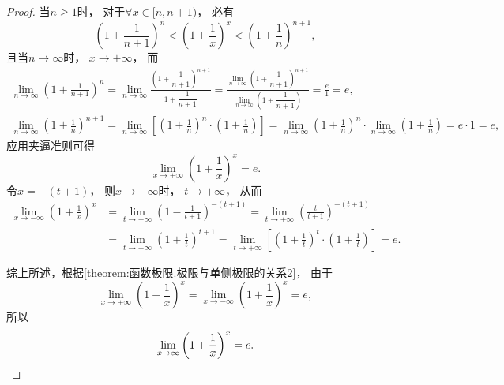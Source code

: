 \begin{example}[重要极限II]
\begin{proof}
当\(n\geq1\)时，
对于\(\forall x\in[n,n+1)\)，
必有\begin{equation*}
	\left(1+\frac1{n+1}\right)^n
	< \left(1+\frac1x\right)^x
	< \left(1+\frac1n\right)^{n+1},
\end{equation*}
且当\(n\to\infty\)时，
\(x\to+\infty\)，
而\begin{gather*}
	\lim_{n\to\infty} \left(1+\frac1{n+1}\right)^n
	= \lim_{n\to\infty} \frac{\left(1+\dfrac1{n+1}\right)^{n+1}}{1+\dfrac1{n+1}}
	= \frac{\lim\limits_{n\to\infty} \left(1+\dfrac1{n+1}\right)^{n+1}}{\lim\limits_{n\to\infty} \left(1+\dfrac1{n+1}\right)}
	= \frac{e}1
	= e, \\
	\lim_{n\to\infty} \left(1+\frac1n\right)^{n+1}
	= \lim_{n\to\infty} \left[\left(1+\frac1n\right)^n\cdot\left(1+\frac1n\right)\right]
	= \lim_{n\to\infty} \left(1+\frac1n\right)^n \cdot \lim_{n\to\infty} \left(1+\frac1n\right)
	= e \cdot 1
	= e,
\end{gather*}
应用\hyperref[theorem:函数极限.夹逼准则]{夹逼准则}可得\begin{equation*}
	\lim_{x\to+\infty} \left(1+\frac1x\right)^x = e.
\end{equation*}
令\(x=-(t+1)\)，
则\(x\to-\infty\)时，
\(t\to+\infty\)，
从而\begin{align*}
	\lim_{x\to-\infty} \left(1+\frac1x\right)^x
	&= \lim_{t\to+\infty} \left(1-\frac{1}{t+1}\right)^{-(t+1)}
	= \lim_{t\to+\infty} \left(\frac{t}{t+1}\right)^{-(t+1)} \\
	&= \lim_{t\to+\infty} \left(1+\frac1t\right)^{t+1}
	= \lim_{t\to+\infty} \left[\left(1+\frac1t\right)^t\cdot\left(1+\frac1t\right)\right]
	= e.
\end{align*}

综上所述，根据\cref{theorem:函数极限.极限与单侧极限的关系2}，
由于\begin{equation*}
	\lim_{x\to+\infty}\left(1+\frac1x\right)^x
	= \lim_{x\to-\infty}\left(1+\frac1x\right)^x
	= e,
\end{equation*}
所以\begin{equation*}
	\lim_{x\to\infty} \left(1+\frac1x\right)^x = e.
	\qedhere
\end{equation*}
\end{proof}
\end{example}
